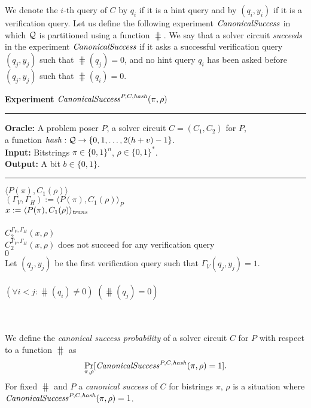 We denote the $i$-th query of $C$ by $q_i$ if it is a hint query and by $(q_i, y_i)$ if it is a verification query.
Let us define the following experiment $\operatorname{\mathit{CanonicalSuccess}}$ in which $\mathcal{Q}$ is partitioned using a function $\hash$.
We say that a solver circuit \textit{succeeds} in the experiment $\operatorname{\mathit{CanonicalSuccess}}$
if it asks a successful verification query $(q_j, y_j)$ such that $\hash(q_j) = 0$,
and no hint query $q_i$ has been asked before $(q_j, y_j)$ such that $\hash(q_i) = 0$.
%
\begin{codeblock}
  \textbf{Experiment} $\operatorname{\mathit{CanonicalSuccess}}^{P, C, \operatorname{\mathit{hash}}}(\pi, \rho)$
  \medskip \hrule
  \textbf{Oracle:} A problem poser $P$, a solver circuit $C = (C_1, C_2)$ for $P$,\\
  \IndII a function $\operatorname{\mathit{hash}}: \mathcal{Q} \rightarrow \{0, 1, \dotsc, 2(h+v) - 1\}$.\\
  \textbf{Input:}  Bitstrings $\pi \in \{0,1\}^n$, $\rho \in \{0,1\}^*$. \\
  \textbf{Output:} A bit $b \in \{0,1\}$.
  \medskip\hrule
  \Run $\langle P(\pi), C_1(\rho) \rangle$ \\
  \IndI $(\Gamma_V, \Gamma_H) := \langle P(\pi), C_1(\rho) \rangle_{P}$ \\
  \IndI $x := \langle P(\pi), C_1(\rho) \rangle_{\operatorname{\mathit{trans}}}$ \\ \\
  \Run $C_2^{\Gamma_V, \Gamma_H} (x, \rho)$ \\
  \IndI \If $C_2^{\Gamma_V, \Gamma_H} (x, \rho)$ does not succeed for any verification query \Then \\
  \IndII \Return $0$ \\
  \IndI Let $(q_j,y_j)$ be the first verification query such that $\Gamma_V(q_j, y_j) = 1$.\\
  \\
  \If $(\forall i < j :  \hash(q_i) \neq 0)$ \And $(\hash(q_j) = 0)$ \Then \\
  \IndI {}\\
  \Else\\
  \IndI {}
\end{codeblock}
%
We define the \textit{canonical success probability} of a solver circuit $C$ for $P$ with respect to a function $\hash$ as
\begin{align}
 \underset{\pi, \rho}{\Pr}[\operatorname{\mathit{CanonicalSuccess}}^{P, C, \operatorname{\mathit{hash}}}(\pi, \rho) = 1].
\end{align}
%
For fixed $\hash$ and $P$ a \textit{canonical success} of $C$ for bistrings $\pi$, $\rho$ is a situation where
$\operatorname{\mathit{CanonicalSuccess}}^{P, C, \operatorname{\mathit{hash}}}(\pi, \rho) = 1$.

